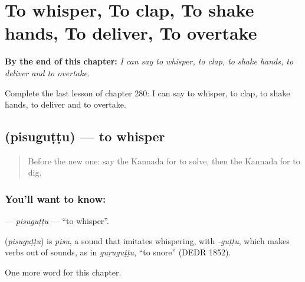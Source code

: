 
\chapter{To whisper, To clap, To shake hands, To deliver, To overtake}
\label{ch:ka-to-whisper-to-clap-to-shake-hands-to-deliver-to-overtake}

\begin{chapteropening}
\textbf{By the end of this chapter:} \emph{I can say to whisper, to clap, to shake hands, to deliver and to overtake.}

Complete the last lesson of chapter 280: I can say to whisper, to clap, to shake hands, to deliver and to overtake.
\end{chapteropening}

\section[\texorpdfstring{\kn{ಪಿಸುಗುಟ್ಟು} (pisuguṭṭu)}{ಪಿಸುಗುಟ್ಟು (pisuguṭṭu)}]{ (pisuguṭṭu) — to whisper}

\label{lesson:KA-C280-pisuguttu}



\begin{quote}
Before the new one: say the Kannada for to solve, then the Kannada for to dig.
\end{quote}

\subsection*{You'll want to know: }
\textbf{} — \emph{pisuguṭṭu} — \textquotedblleft{}to whisper\textquotedblright{}.

\begin{cousinweb}
\textbf{} (\emph{pisuguṭṭu}) is \emph{pisu}, a sound that imitates whispering, with \emph{-guṭṭu}, which makes verbs out of sounds, as in \emph{guṟuguṭṭu}, \textquotedblleft{}to snore\textquotedblright{} (DEDR 1852).
\end{cousinweb}

\begin{grammarlens}[title={What you've built}]
One more word for this chapter.
\end{grammarlens}

